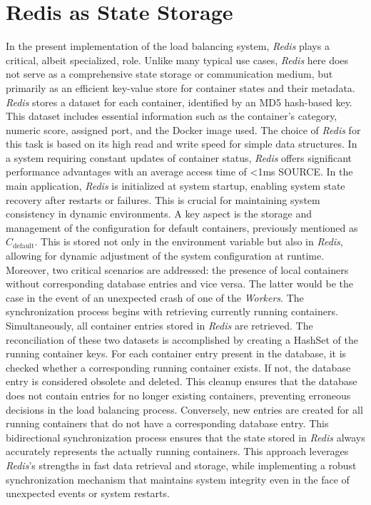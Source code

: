 \documentclass[twocolumn]{webofc}
\begin{document}
\section{Redis as State Storage}
In the present implementation of the load balancing system, \textit{Redis} plays a critical, albeit specialized, role. Unlike many typical use cases, \textit{Redis} here does not serve as a comprehensive state storage or communication medium, but primarily as an efficient key-value store for container states and their metadata. \textit{Redis} stores a dataset for each container, identified by an MD5 hash-based key. This dataset includes essential information such as the container's category, numeric score, assigned port, and the Docker image used. The choice of \textit{Redis} for this task is based on its high read and write speed for simple data structures. 
In a system requiring constant updates of container status, \textit{Redis} offers significant performance advantages with an average access time of <1ms {\color{red} SOURCE}. In the main application, \textit{Redis} is initialized at system startup, enabling system state recovery after restarts or failures. This is crucial for maintaining system consistency in dynamic environments. A key aspect is the storage and management of the configuration for default containers, previously mentioned as \( C_{\text{default}} \). This is stored not only in the environment variable but also in \textit{Redis}, allowing for dynamic adjustment of the system configuration at runtime. Moreover, two critical scenarios are addressed: the presence of local containers without corresponding database entries and vice versa. The latter would be the case in the event of an unexpected crash of one of the \textit{Workers}. The synchronization process begins with retrieving currently running containers. Simultaneously, all container entries stored in \textit{Redis} are retrieved. The reconciliation of these two datasets is accomplished by creating a HashSet of the running container keys. For each container entry present in the database, it is checked whether a corresponding running container exists. If not, the database entry is considered obsolete and deleted. This cleanup ensures that the database does not contain entries for no longer existing containers, preventing erroneous decisions in the load balancing process. Conversely, new entries are created for all running containers that do not have a corresponding database entry. This bidirectional synchronization process ensures that the state stored in \textit{Redis} always accurately represents the actually running containers. This approach leverages \textit{Redis}'s strengths in fast data retrieval and storage, while implementing a robust synchronization mechanism that maintains system integrity even in the face of unexpected events or system restarts.
\end{document}
